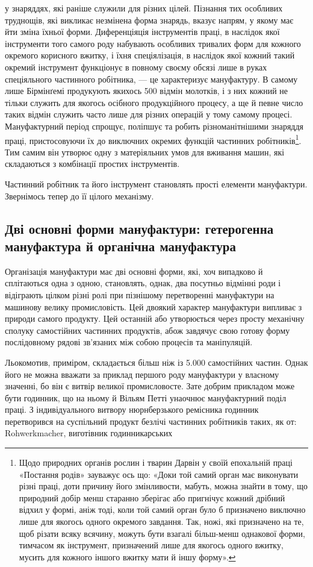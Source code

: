 \parcont{}  %
у знаряддях, які раніше служили для різних цілей. Пізнання
тих особливих труднощів, які викликає незмінена форма знарядь,
вказує напрям, у якому має йти зміна їхньої форми. Диференціяція
інструментів праці, в наслідок якої інструменти того самого роду
набувають особливих тривалих форм для кожного окремого
корисного вжитку, і їхня спеціялізація, в наслідок якої кожний
такий окремий інструмент функціонує в повному своєму обсязі
лише в руках спеціяльного частинного робітника, — це характеризує мануфактуру.
В самому лише Бірмінґемі продукують
якихось 500 відмін молотків, і з них кожний не тільки служить
для якогось осібного продукційного процесу, а ще й певне число
таких відмін служить часто лише для різних операцій у тому
самому процесі. Мануфактурний період спрощує, поліпшує та
робить різноманітнішими знаряддя праці, пристосовуючи їх до
виключних окремих функцій частинних робітників\footnote{
Щодо природних органів рослин і тварин Дарвін у своїй епохальній праці
«Постання родів» зауважує ось що: «Доки той самий орган має виконувати різні
праці, доти причину його змінливости, мабуть, можна знайти в тому, що природний
добір менш старанно зберігає або пригнічує кожний дрібний відхил у
формі, аніж тоді, коли той самий орган було б призначено виключно лише для
якогось одного окремого завдання. Так, ножі, які призначено на те, щоб різати
всяку всячину, можуть бути взагалі більш-менш однакової форми, тимчасом як
інструмент, призначений лише для якогось одного вжитку, мусить для кожного
іншого вжитку мати й іншу форму».
}. Тим самим він утворює одну з матеріяльних умов для вживання машин,
які складаються з комбінації простих інструментів.

Частинний робітник та його інструмент становлять прості
елементи мануфактури. Звернімось тепер до її цілого механізму.

\subsection{Дві основні форми мануфактури: гетерогенна мануфактура
й органічна мануфактура}

Організація мануфактури має дві основні форми, які, хоч
випадково й сплітаються одна з одною, становлять, однак, два
посутньо відмінні роди і відіграють цілком різні ролі при пізнішому перетворенні
мануфактури на машинову велику промисловість. Цей двоякий характер мануфактури
випливає з природи самого продукту. Цей останній або утворюється через просту
механічну сполуку самостійних частинних продуктів, абож
завдячує свою готову форму послідовному рядові зв’язаних між
собою процесів та маніпуляцій.

Льокомотив, приміром, складається більш ніж із \num{5.000} самостійних частин. Однак
його не можна вважати за приклад першого роду мануфактури у власному значенні,
бо він є витвір великої промисловосте. Зате добрим прикладом може бути годинник,
що на ньому й Вільям Петті унаочнює мануфактурний поділ праці. З індивідуального
витвору нюрнберзького ремісника годинник перетворився на суспільний продукт
безлічі частинних робітників
таких, як от: Rohwerkmacher, виготівник годинникарських
\parbreak{}  %
